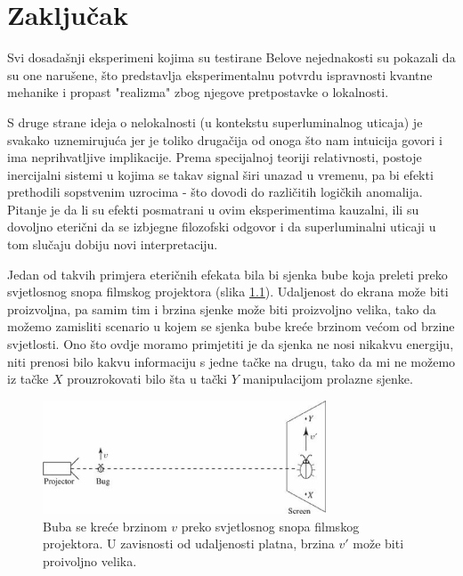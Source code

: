 \chapter{Zaključak}

Svi dosadašnji eksperimeni kojima su testirane Belove nejednakosti su pokazali da su one narušene, što predstavlja eksperimentalnu potvrdu ispravnosti kvantne mehanike i propast "realizma" zbog njegove pretpostavke o lokalnosti.

S druge strane ideja o nelokalnosti (u kontekstu superluminalnog uticaja) je svakako uznemiruju\' ca jer je toliko druga\v cija od onoga \v sto nam intuicija govori i ima neprihvatljive implikacije.
Prema specijalnoj teoriji relativnosti, postoje inercijalni sistemi u kojima se takav signal \v siri unazad u vremenu, pa bi efekti prethodili sopstvenim uzrocima - \v sto dovodi do
razli\v citih logi\v ckih anomalija.
Pitanje je da li su efekti posmatrani u ovim eksperimentima kauzalni, ili su dovoljno eteri\v cni da se izbjegne filozofski odgovor i da superluminalni uticaji u tom slu\v caju
dobiju novi interpretaciju.

Jedan od takvih primjera eteri\v cnih efekata bila bi sjenka bube koja preleti preko svjetlosnog snopa filmskog projektora (slika \ref{fig:bug_on_screen}). Udaljenost do ekrana mo\v ze biti proizvoljna, pa samim tim i brzina sjenke
mo\v ze biti proizvoljno velika, tako da mo\v zemo zamisliti scenario u kojem se sjenka bube kre\' ce brzinom ve\' com od brzine svjetlosti.
Ono \v sto ovdje moramo primjetiti je da sjenka ne nosi nikakvu energiju, niti prenosi bilo kakvu informaciju s jedne ta\v cke na drugu, tako da mi ne mo\v zemo iz ta\v cke $X$ prouzrokovati bilo
\v sta u ta\v cki $Y$ manipulacijom prolazne sjenke.

\begin{figure}[H]
    \centering
    \includegraphics[width=0.75\textwidth]{figures/bug_on_screen.eps}
    \caption{Buba se kre\' ce brzinom $v$ preko svjetlosnog snopa filmskog projektora. U zavisnosti od udaljenosti platna, brzina $v'$ mo\v ze biti proivoljno velika.}
    \label{fig:bug_on_screen}
\end{figure}


